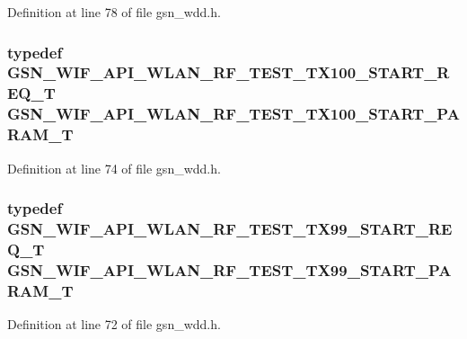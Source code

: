 Definition at line 78 of file gsn\_\-wdd.h.

\hypertarget{a00603_aa8de226d51c4838cb6556845208d7ba3}{
\subsubsection[{GSN\_\-WIF\_\-API\_\-WLAN\_\-RF\_\-TEST\_\-TX100\_\-START\_\-PARAM\_\-T}]{\setlength{\rightskip}{0pt plus 5cm}typedef {\bf GSN\_\-WIF\_\-API\_\-WLAN\_\-RF\_\-TEST\_\-TX100\_\-START\_\-REQ\_\-T} {\bf GSN\_\-WIF\_\-API\_\-WLAN\_\-RF\_\-TEST\_\-TX100\_\-START\_\-PARAM\_\-T}}}
\label{a00603_aa8de226d51c4838cb6556845208d7ba3}


Definition at line 74 of file gsn\_\-wdd.h.

\hypertarget{a00603_ac1e5dbed32ee024fa928fd5f19962055}{
\subsubsection[{GSN\_\-WIF\_\-API\_\-WLAN\_\-RF\_\-TEST\_\-TX99\_\-START\_\-PARAM\_\-T}]{\setlength{\rightskip}{0pt plus 5cm}typedef {\bf GSN\_\-WIF\_\-API\_\-WLAN\_\-RF\_\-TEST\_\-TX99\_\-START\_\-REQ\_\-T} {\bf GSN\_\-WIF\_\-API\_\-WLAN\_\-RF\_\-TEST\_\-TX99\_\-START\_\-PARAM\_\-T}}}
\label{a00603_ac1e5dbed32ee024fa928fd5f19962055}


Definition at line 72 of file gsn\_\-wdd.h.



